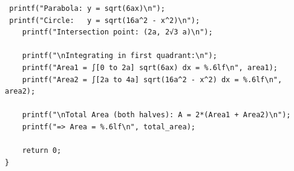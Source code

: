 \documentclass{beamer}
\theoremstyle{remark}
\numberwithin{equation}{section}
\begin{document}
 \begin{frame}[fragile]
 \begin{lstlisting}
 printf("Parabola: y = sqrt(6ax)\n"); 
 printf("Circle:   y = sqrt(16a^2 - x^2)\n");
    printf("Intersection point: (2a, 2√3 a)\n");

    printf("\nIntegrating in first quadrant:\n");
    printf("Area1 = ∫[0 to 2a] sqrt(6ax) dx = %.6lf\n", area1);
    printf("Area2 = ∫[2a to 4a] sqrt(16a^2 - x^2) dx = %.6lf\n", area2);

    printf("\nTotal Area (both halves): A = 2*(Area1 + Area2)\n");
    printf("=> Area = %.6lf\n", total_area);

    return 0;
}

\end{lstlisting}
\end{frame}
\end{document}
